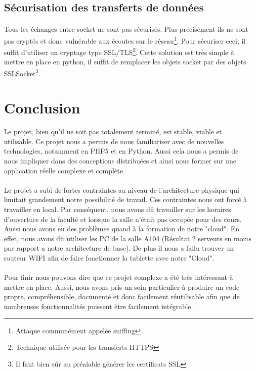 \documentclass[a4paper,12pt]{article}
\begin{document}
\subsection{Sécurisation des transferts de données}
\paragraph*{}
Tous les échanges entre socket ne sont pas sécurisés. Plus précisément ils ne sont pas cryptés et donc vulnérable aux écoutes sur le réseau\footnote{Attaque communément appelée sniffing}. Pour sécuriser ceci, il suffit d'utiliser un cryptage type SSL/TLS\footnote{Technique utilisée pour les transferts HTTPS}. Cette solution est très simple à mettre en place en python, il suffit de remplacer les objets socket par des objets SSLSocket\footnote{Il faut bien sûr au préalable générer les certificats SSL}.

\newpage

\section{Conclusion}
\paragraph*{}

Le projet, bien qu'il ne soit pas totalement terminé, est stable, viable et utilisable. Ce projet nous a permis de nous familiariser avec de nouvelles technologies, notamment en PHP5 et en Python. Aussi cela nous a permis de nous impliquer dans des conceptions distribuées et ainsi nous former sur une application réelle complexe et complète.

\paragraph*{}
Le projet a subi de fortes contraintes au niveau de l'architecture physique qui limitait grandement notre possibilité de travail. Ces contraintes nous ont forcé à travailler en local. Par conséquent, nous avons dû travailler sur les horaires d'ouverture de la faculté et lorsque la salle n'était pas occupée pour des cours. Aussi nous avons eu des problèmes quand à la formation de notre "cloud". En effet, nous avons dû utiliser les PC de la salle A104 (Résultat 2 serveurs en moins par rapport a notre architecture de base). De plus il nous a fallu trouver un routeur WIFI afin de faire fonctionner la tablette avec notre "Cloud".

\paragraph*{}
Pour finir nous pouvons dire que ce projet complexe a été très intéressant à mettre en place. Aussi, nous avons pris un soin particulier à produire un code propre, compréhensible, documenté et donc facilement réutilisable afin que de nombreuses fonctionnalités puissent être facilement intégrable. 


\newpage
\listoffigures
\end{document}
